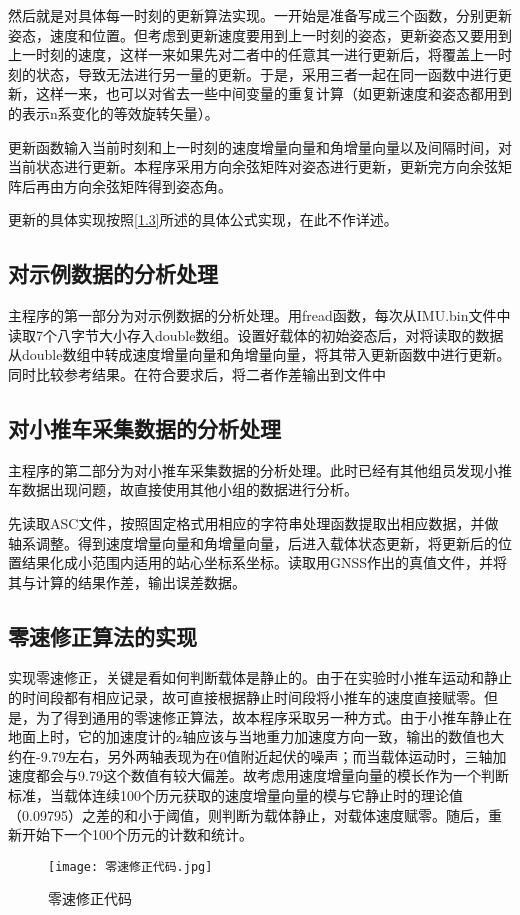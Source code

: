 \documentclass{ctexart}
\begin{document}
然后就是对具体每一时刻的更新算法实现。一开始是准备写成三个函数，分别更新姿态，速度和位置。但考虑到更新速度要用到上一时刻的姿态，更新姿态又要用到上一时刻的速度，这样一来如果先对二者中的任意其一进行更新后，将覆盖上一时刻的状态，导致无法进行另一量的更新。于是，采用三者一起在同一函数中进行更新，这样一来，也可以对省去一些中间变量的重复计算（如更新速度和姿态都用到的表示n系变化的等效旋转矢量）。

更新函数输入当前时刻和上一时刻的速度增量向量和角增量向量以及间隔时间，对当前状态进行更新。本程序采用方向余弦矩阵对姿态进行更新，更新完方向余弦矩阵后再由方向余弦矩阵得到姿态角。

更新的具体实现按照\ref{1.3}所述的具体公式实现，在此不作详述。
\subsection{对示例数据的分析处理}
主程序的第一部分为对示例数据的分析处理。用fread函数，每次从IMU.bin文件中读取7个八字节大小存入double数组。设置好载体的初始姿态后，对将读取的数据从double数组中转成速度增量向量和角增量向量，将其带入更新函数中进行更新。同时比较参考结果。在符合要求后，将二者作差输出到文件中
\subsection{对小推车采集数据的分析处理}
主程序的第二部分为对小推车采集数据的分析处理。此时已经有其他组员发现小推车数据出现问题，故直接使用其他小组的数据进行分析。

先读取ASC文件，按照固定格式用相应的字符串处理函数提取出相应数据，并做轴系调整。得到速度增量向量和角增量向量，后进入载体状态更新，将更新后的位置结果化成小范围内适用的站心坐标系坐标。读取用GNSS作出的真值文件，并将其与计算的结果作差，输出误差数据。
\subsection{零速修正算法的实现}
实现零速修正，关键是看如何判断载体是静止的。由于在实验时小推车运动和静止的时间段都有相应记录，故可直接根据静止时间段将小推车的速度直接赋零。但是，为了得到通用的零速修正算法，故本程序采取另一种方式。由于小推车静止在地面上时，它的加速度计的z轴应该与当地重力加速度方向一致，输出的数值也大约在-9.79左右，另外两轴表现为在0值附近起伏的噪声；而当载体运动时，三轴加速度都会与9.79这个数值有较大偏差。故考虑用速度增量向量的模长作为一个判断标准，当载体连续100个历元获取的速度增量向量的模与它静止时的理论值（0.09795）之差的和小于阈值，则判断为载体静止，对载体速度赋零。随后，重新开始下一个100个历元的计数和统计。
\begin{figure}[H]
\texttt{[image: 零速修正代码.jpg]}
\caption{零速修正代码}
\end{figure}
\end{document}
